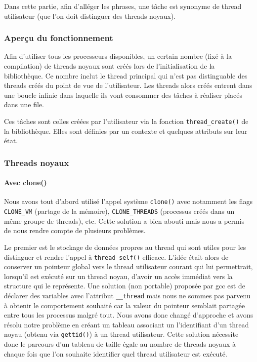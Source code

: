 Dans cette partie, afin d'alléger les phrases, une tâche est synonyme de thread utilisateur (que l'on doit distinguer des threads noyaux).

\subsubsection{Aperçu du fonctionnement}

Afin d'utiliser tous les processeurs disponibles, un certain nombre (fixé à la compilation) de threads noyaux sont créés lors de l'initialisation de la bibliothèque. Ce nombre inclut le thread principal qui n'est pas distinguable des threads créés du point de vue de l'utilisateur. Les threads alors créés entrent dans une boucle infinie dans laquelle ils vont consommer des tâches à réaliser placés dans une file.

Ces tâches sont celles créées par l'utilisateur via la fonction \verb!thread_create()! de la bibliothèque. Elles sont définies par un contexte et quelques attributs sur leur état.


\subsubsection{Threads noyaux}

\paragraph{Avec clone()}
Nous avons tout d'abord utilisé l'appel système \verb!clone()! avec notamment les flags \verb!CLONE_VM! (partage de la mémoire), \verb!CLONE_THREADS! (processus créés dans un même groupe de threads), etc. Cette solution a bien abouti mais nous a permis de nous rendre compte de plusieurs problèmes.

Le premier est le stockage de données propres au thread qui sont utiles pour les distinguer et rendre l'appel à \verb!thread_self()! efficace. L'idée était alors de conserver un pointeur global vers le thread utilisateur courant qui lui permettrait, lorsqu'il est exécuté sur un thread noyau, d'avoir un accès immédiat vers la structure qui le représente. Une solution (non portable) proposée par gcc est de déclarer des variables avec l'attribut \verb!__thread! mais nous ne sommes pas parvenu à obtenir le comportement souhaité car la valeur du pointeur semblait partagée entre tous les processus malgré tout. Nous avons donc changé d'approche et avons résolu notre problème en créant un tableau associant un l'identifiant d'un thread noyau (obtenu via \verb!gettid()!) à un thread utilisateur. Cette solution nécessite donc le parcours d'un tableau de taille égale au nombre de threads noyaux à chaque fois que l'on souhaite identifier quel thread utilisateur est exécuté.

